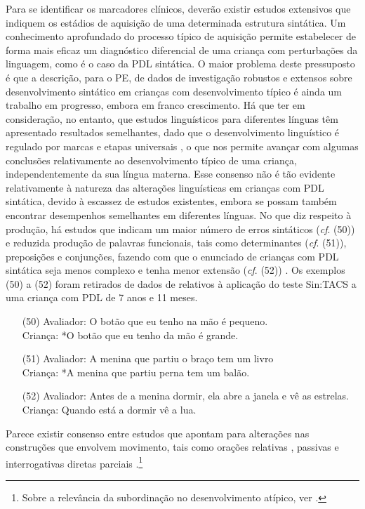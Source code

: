 \documentclass[output=paper,colorlinks,citecolor=brown,booklanguage=portuguese]{langscibook}
\begin{document}
Para se identificar os marcadores clínicos, deverão existir estudos extensivos que indiquem os estádios de aquisição de uma determinada estrutura sintática. Um conhecimento aprofundado do processo típico de aquisição permite estabelecer de forma mais eficaz um diagnóstico diferencial de uma criança com perturbações da linguagem, como é o caso da PDL sintática. O maior problema deste pressuposto é que a descrição, para o PE, de dados de investigação robustos e extensos sobre desenvolvimento sintático em crianças com desenvolvimento típico é ainda um trabalho em progresso, embora em franco crescimento.  Há que ter em consideração, no entanto, que estudos linguísticos para diferentes línguas têm apresentado resultados semelhantes, dado que o desenvolvimento linguístico é regulado por marcas e etapas universais \citep{SimSim1998}, o que nos permite avançar com algumas conclusões relativamente ao desenvolvimento típico de uma criança, independentemente da sua língua materna. Esse consenso não é tão evidente relativamente à natureza das alterações linguísticas em crianças com PDL sintática, devido à escassez de estudos existentes, embora se possam também encontrar desempenhos semelhantes em diferentes línguas.  No que diz respeito à produção, há estudos que indicam um maior número de erros sintáticos (\emph{cf}. (50)) e reduzida produção de palavras funcionais, tais como determinantes (\emph{cf}. (51)), preposições e conjunções, fazendo com que o enunciado de crianças com PDL sintática seja menos complexo e tenha menor extensão (\emph{cf}. (52)) \citep{Araujo2007, Silveira2011}. Os exemplos (50) a (52) foram retirados de dados de \citet{Martinsempreparacao} relativos à aplicação do teste Sin:TACS a uma criança com PDL de 7 anos e 11 meses.

\begin{enumerate}[align=left]
    \item [(50)] 	Avaliador: O botão que eu tenho na mão é pequeno.\\
	Criança: *O botão que eu tenho da mão é grande.
\item[(51)] 	Avaliador: A menina que partiu o braço tem um livro\\
	Criança: *A menina que partiu perna tem um balão.
\item[(52)] 	Avaliador: Antes de a menina dormir, ela abre a janela e vê as estrelas.\\
	Criança: Quando está a dormir vê a lua.
\end{enumerate}

Parece existir consenso entre estudos que apontam para alterações nas construções que envolvem movimento, tais como orações relativas \citep{Novogrodsky2006}, passivas \citep{Lely1996a} e interrogativas diretas parciais \citep{Friedmann2011}.\footnote{Sobre a relevância da subordinação no desenvolvimento atípico, ver .}
\end{document}

